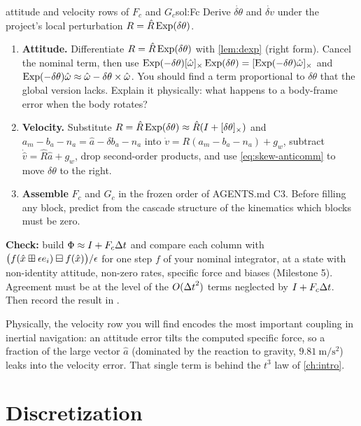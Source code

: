 \begin{derivex}{attitude and velocity rows of $F_c$ and $G_c$}{sol:Fc}
Derive $\dot{\delta\theta}$ and $\dot{\delta v}$ under the project's local perturbation $R = \hat R\operatorname{Exp}(\delta\theta)$.
\begin{enumerate}
  \item \textbf{Attitude.} Differentiate $R = \hat R\operatorname{Exp}(\delta\theta)$ with \cref{lem:dexp} (right form). Cancel the nominal
        term, then use $\operatorname{Exp}(-\delta\theta)[\hat\omega]_{\times}\operatorname{Exp}(\delta\theta) = [\operatorname{Exp}(-\delta\theta)\hat\omega]_{\times}$ and
        $\operatorname{Exp}(-\delta\theta)\hat\omega \approx \hat\omega - \delta\theta\times\hat\omega$. You should find a term proportional to $\delta\theta$ that the global
        version lacks. Explain it physically: what happens to a body-frame error when the body rotates?
  \item \textbf{Velocity.} Substitute $R = \hat R\operatorname{Exp}(\delta\theta) \approx \hat R(I + [\delta\theta]_{\times})$ and
        $a_m - b_a - n_a = \hat a - \delta b_a - n_a$ into $\dot v = R(a_m - b_a - n_a) + g_w$, subtract
        $\dot{\hat v} = \hat R\hat a + g_w$, drop second-order products, and use \eqref{eq:skew-anticomm} to move $\delta\theta$ to the
        right.
  \item \textbf{Assemble} $F_c$ and $G_c$ in the frozen order of AGENTS.md C3. Before filling any block, predict
        from the cascade structure of the kinematics which blocks must be zero.
\end{enumerate}
\textbf{Check:} build $\Phi \approx I + F_c{\Delta t}$ and compare each column with
$\big(f(\hat x\boxplus\epsilon e_i)\boxminus f(\hat x)\big)/\epsilon$ for one step $f$ of your nominal integrator, at a state with
non-identity attitude, non-zero rates, specific force and biases (Milestone 5). Agreement must be at the level
of the $O({\Delta t}^2)$ terms neglected by $I + F_c{\Delta t}$. Then record the result in .
\end{derivex}

Physically, the velocity row you will find encodes the most important coupling in inertial navigation: an
attitude error tilts the computed specific force, so a fraction of the large vector $\hat a$ (dominated by the
reaction to gravity, $9.81~\mathrm{m/s^2}$) leaks into the velocity error. That single term is behind the
$t^3$ law of \cref{ch:intro}.

\section{Discretization}

